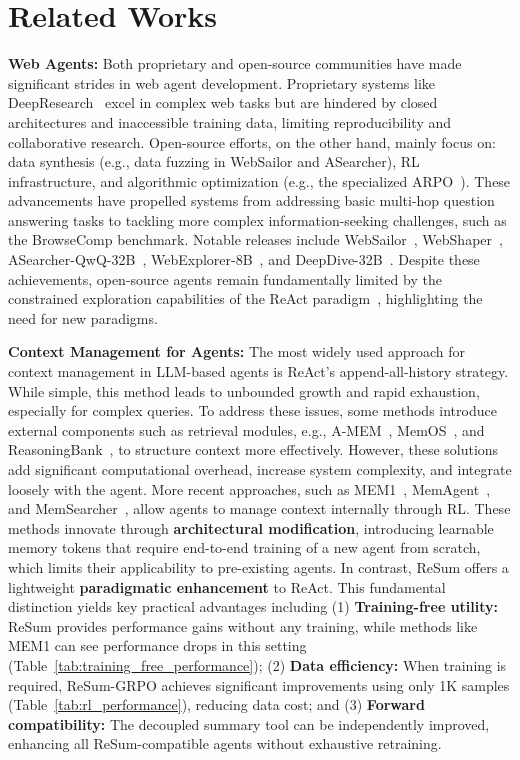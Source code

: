 \section{Related Works}\label{appendix:related_work}

\textbf{Web Agents:} Both proprietary and open-source communities have made significant strides in web agent development. Proprietary systems like DeepResearch~\citep{openai_deep_research} excel in complex web tasks but are hindered by closed architectures and inaccessible training data, limiting reproducibility and collaborative research. Open-source efforts, on the other hand, mainly focus on: data synthesis (e.g., data fuzzing in WebSailor and ASearcher), RL infrastructure, and algorithmic optimization (e.g., the specialized ARPO~\citep{dong2025arpo}). 
These advancements have propelled systems from addressing basic multi-hop question answering tasks to tackling more complex information-seeking challenges, such as the BrowseComp benchmark. Notable releases include WebSailor~\citep{li2025websailor}, WebShaper~\citep{tao2025webshaper}, ASearcher-QwQ-32B~\citep{gao2025asearcher}, WebExplorer-8B~\citep{liu2025webexplorer}, and DeepDive-32B~\citep{lu2025deepdiveadvancingdeepsearch}. Despite these achievements, open-source agents remain fundamentally limited by the constrained exploration capabilities of the ReAct paradigm~\citep{yao2023react}, highlighting the need for new paradigms.

\textbf{Context Management for Agents:} The most widely used approach for context management in LLM-based agents is ReAct's append-all-history strategy. While simple, this method leads to unbounded growth and rapid exhaustion, especially for complex queries. To address these issues, some methods introduce external components such as retrieval modules, e.g., A-MEM~\citep{xu2025mem}, MemOS~\citep{li2025memos_long}, and ReasoningBank~\citep{ouyang2025reasoningbank}, to structure context more effectively. However, these solutions add significant computational overhead, increase system complexity, and integrate loosely with the agent. More recent approaches, such as MEM1~\citep{zhou2025mem1}, MemAgent~\citep{yu2025memagent}, and MemSearcher~\citep{yuan2025memsearcher}, allow agents to manage context internally through RL. These methods innovate through \textbf{architectural modification}, introducing learnable memory tokens that require end-to-end training of a new agent from scratch, which limits their applicability to pre-existing agents.
In contrast, ReSum offers a lightweight \textbf{paradigmatic enhancement} to ReAct. This fundamental distinction yields key practical advantages including (1) \textbf{Training-free utility:} ReSum provides performance gains without any training, while methods like MEM1 can see performance drops in this setting (Table~\ref{tab:training_free_performance}); (2) \textbf{Data efficiency:} When training is required, ReSum-GRPO achieves significant improvements using only 1K samples (Table~\ref{tab:rl_performance}), reducing data cost; and (3) \textbf{Forward compatibility:} The decoupled summary tool can be independently improved, enhancing all ReSum-compatible agents without exhaustive retraining. 


